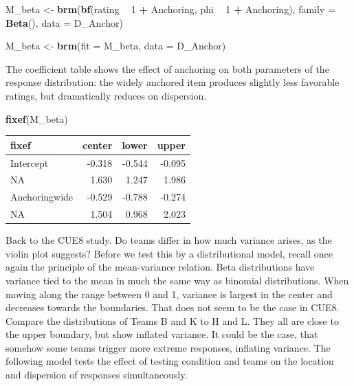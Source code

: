 \documentclass[]{svmono}
\newenvironment{Shaded}{\begin{snugshade}}{\end{snugshade}}
\newcommand{\KeywordTok}[1]{\textcolor[rgb]{0.13,0.29,0.53}{\textbf{#1}}}
\newcommand{\DataTypeTok}[1]{\textcolor[rgb]{0.13,0.29,0.53}{#1}}
\newcommand{\DecValTok}[1]{\textcolor[rgb]{0.00,0.00,0.81}{#1}}
\newcommand{\StringTok}[1]{\textcolor[rgb]{0.31,0.60,0.02}{#1}}
\newcommand{\OperatorTok}[1]{\textcolor[rgb]{0.81,0.36,0.00}{\textbf{#1}}}
\newcommand{\NormalTok}[1]{#1}
\begin{document}
\begin{Shaded}
\begin{Highlighting}[]
\NormalTok{M_beta <-}\StringTok{ }\KeywordTok{brm}\NormalTok{(}\KeywordTok{bf}\NormalTok{(rating }\OperatorTok{~}\StringTok{ }\DecValTok{1} \OperatorTok{+}\StringTok{ }\NormalTok{Anchoring,}
\NormalTok{              phi }\OperatorTok{~}\StringTok{ }\DecValTok{1} \OperatorTok{+}\StringTok{ }\NormalTok{Anchoring),}
           \DataTypeTok{family =} \KeywordTok{Beta}\NormalTok{(),}
           \DataTypeTok{data =}\NormalTok{ D_Anchor)}

\NormalTok{M_beta <-}\StringTok{ }\KeywordTok{brm}\NormalTok{(}\DataTypeTok{fit =}\NormalTok{ M_beta, }\DataTypeTok{data =}\NormalTok{ D_Anchor)}
\end{Highlighting}
\end{Shaded}

The coefficient table shows the effect of anchoring on both parameters
of the response distribution: the widely anchored item produces slightly
less favorable ratings, but dramatically reduces on dispersion.

\begin{Shaded}
\begin{Highlighting}[]
\KeywordTok{fixef}\NormalTok{(M_beta)}
\end{Highlighting}
\end{Shaded}

\begin{longtable}[]{@{}lrrr@{}}
\toprule
fixef & center & lower & upper\tabularnewline
\midrule
\endhead
Intercept & -0.318 & -0.544 & -0.095\tabularnewline
NA & 1.630 & 1.247 & 1.986\tabularnewline
Anchoringwide & -0.529 & -0.788 & -0.274\tabularnewline
NA & 1.504 & 0.968 & 2.023\tabularnewline
\bottomrule
\end{longtable}

Back to the CUE8 study. Do teams differ in how much variance arises, as
the violin plot suggests? Before we test this by a distributional model,
recall once again the principle of the mean-variance relation. Beta
distributions have variance tied to the mean in much the same way as
binomial distributions. When moving along the range between 0 and 1,
variance is largest in the center and decreases towards the boundaries.
That does not seem to be the case in CUE8. Compare the distributions of
Teams B and K to H and L. They all are close to the upper boundary, but
show inflated variance. It could be the case, that somehow some teams
trigger more extreme responses, inflating variance. The following model
tests the effect of testing condition and teams on the location and
dispersion of responses simultaneously.
\end{document}
